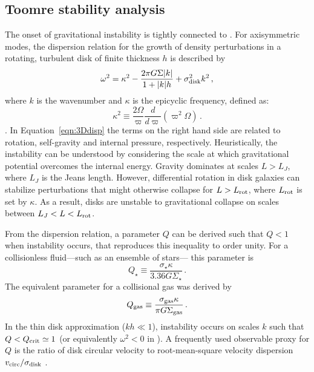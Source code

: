 \IfFileExists{emulateapjlegacy.cls}{\documentclass[iop]{emulateapjlegacy}}{\documentclass[iop]{emulateapj}}
\def\altomega{\varpi}
\begin{document}
\subsection{Toomre stability analysis}\label{sec:Q}

The onset of gravitational instability is tightly connected to \SF \citep[e.g.,][]{Kennicutt89a, Wang94a, Li05b, Li06a}. For axisymmetric modes, the dispersion relation for the growth of density perturbations in a rotating, turbulent disk of finite thickness $h$ is described by
\begin{equation}
\omega^2 = \kappa^2 - \frac{2\pi G \Sigma |k|}{1 + |k| h} + \sigma_{\rm disk}^2 k^2\,,
\label{eqn:3Ddisp}
\end{equation}
where $k$ is the wavenumber and $\kappa$ is the epicyclic frequency, defined as:
\begin{equation}
\kappa^2\equiv\frac{2\Omega}{\altomega}\frac{d}{d\altomega}\left(\altomega^2\Omega\right)\,.
\label{eqn:kappa}
\end{equation}
\citep{Romeo92a}.
In Equation~\ref{eqn:3Ddisp} the terms on the right hand side are related to rotation, self-gravity and internal pressure, respectively. Heuristically, the instability can be understood by considering the scale at which gravitational potential overcomes the internal energy. Gravity dominates at scales $L > L_J$, where $L_J$ is the Jeans length. However, differential rotation in disk galaxies can stabilize perturbations that might otherwise collapse for $L > L_{\rm rot}$, where $L_{\rm rot}$ is set by $\kappa$. As a result, disks are unstable to gravitational collapse on scales between $L_J < L < L_{\rm rot}$.

From the dispersion relation, a parameter $Q$ can be derived such that $Q < 1$ when instability occurs, that reproduces this inequality to order unity. For a collisionless fluid---such as an ensemble of stars--- this parameter is \citep{Toomre64a}
\begin{equation}
Q_{\star} \equiv\frac{\sigma_{\star}\kappa}{3.36 G \Sigma_{\star}}\,.
\end{equation}
The equivalent parameter for a collisional gas was derived by \citet{Goldreich65a}
\begin{equation}
Q_{\rm gas}\equiv\frac{\sigma_{\rm gas}\kappa}{\pi G \Sigma_{\rm gas}}\,.
\label{eqn:Q}
\end{equation}
In the thin disk approximation ($kh\ll1$), instability occurs on scales $k$ such that $Q < Q_{\rm crit}\simeq1$ (or equivalently $\omega^2 < 0$ in ). A frequently used observable proxy for $Q$ is the ratio of disk circular velocity to root-mean-square velocity dispersion $v_{\rm circ}/\sigma_{\rm disk}$ \citep[e.g.,][]{GarciaBurillo03a, Genzel11a, Kassin12a, Leung19a}.
%
\end{document}
